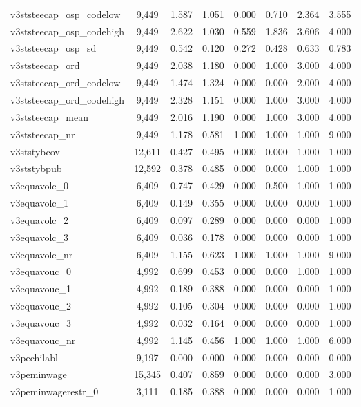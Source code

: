 \begin{table}[!htbp]
\begin{tabular}{@{\extracolsep{5pt}}lccccccc}
v3ststeecap\_osp\_codelow & 9,449 & 1.587 & 1.051 & 0.000 & 0.710 & 2.364 & 3.555 \\ 
v3ststeecap\_osp\_codehigh & 9,449 & 2.622 & 1.030 & 0.559 & 1.836 & 3.606 & 4.000 \\ 
v3ststeecap\_osp\_sd & 9,449 & 0.542 & 0.120 & 0.272 & 0.428 & 0.633 & 0.783 \\ 
v3ststeecap\_ord & 9,449 & 2.038 & 1.180 & 0.000 & 1.000 & 3.000 & 4.000 \\ 
v3ststeecap\_ord\_codelow & 9,449 & 1.474 & 1.324 & 0.000 & 0.000 & 2.000 & 4.000 \\ 
v3ststeecap\_ord\_codehigh & 9,449 & 2.328 & 1.151 & 0.000 & 1.000 & 3.000 & 4.000 \\ 
v3ststeecap\_mean & 9,449 & 2.016 & 1.190 & 0.000 & 1.000 & 3.000 & 4.000 \\ 
v3ststeecap\_nr & 9,449 & 1.178 & 0.581 & 1.000 & 1.000 & 1.000 & 9.000 \\ 
v3ststybcov & 12,611 & 0.427 & 0.495 & 0.000 & 0.000 & 1.000 & 1.000 \\ 
v3ststybpub & 12,592 & 0.378 & 0.485 & 0.000 & 0.000 & 1.000 & 1.000 \\ 
v3equavolc\_0 & 6,409 & 0.747 & 0.429 & 0.000 & 0.500 & 1.000 & 1.000 \\ 
v3equavolc\_1 & 6,409 & 0.149 & 0.355 & 0.000 & 0.000 & 0.000 & 1.000 \\ 
v3equavolc\_2 & 6,409 & 0.097 & 0.289 & 0.000 & 0.000 & 0.000 & 1.000 \\ 
v3equavolc\_3 & 6,409 & 0.036 & 0.178 & 0.000 & 0.000 & 0.000 & 1.000 \\ 
v3equavolc\_nr & 6,409 & 1.155 & 0.623 & 1.000 & 1.000 & 1.000 & 9.000 \\ 
v3equavouc\_0 & 4,992 & 0.699 & 0.453 & 0.000 & 0.000 & 1.000 & 1.000 \\ 
v3equavouc\_1 & 4,992 & 0.189 & 0.388 & 0.000 & 0.000 & 0.000 & 1.000 \\ 
v3equavouc\_2 & 4,992 & 0.105 & 0.304 & 0.000 & 0.000 & 0.000 & 1.000 \\ 
v3equavouc\_3 & 4,992 & 0.032 & 0.164 & 0.000 & 0.000 & 0.000 & 1.000 \\ 
v3equavouc\_nr & 4,992 & 1.145 & 0.456 & 1.000 & 1.000 & 1.000 & 6.000 \\ 
v3pechilabl & 9,197 & 0.000 & 0.000 & 0.000 & 0.000 & 0.000 & 0.000 \\ 
v3peminwage & 15,345 & 0.407 & 0.859 & 0.000 & 0.000 & 0.000 & 3.000 \\ 
v3peminwagerestr\_0 & 3,111 & 0.185 & 0.388 & 0.000 & 0.000 & 0.000 & 1.000 \\ 

\end{tabular}
\end{table}
